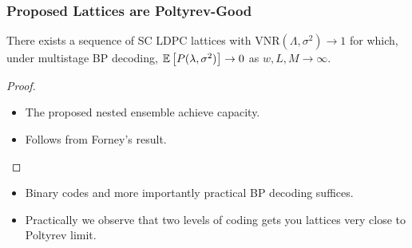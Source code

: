 \documentclass[10pt]{beamer}
\begin{document}
\begin{frame}\frametitle{Proposed Lattices are Poltyrev-Good}
\begin{theorem}
There exists a sequence of SC LDPC lattices with VNR$(\Lambda,\sigma^{2})\rightarrow 1$ for which, under multistage BP decoding, $\mathbb{E}\left[P(\lambda,\sigma^{2})\right]\rightarrow 0$ as $w,L,M  \rightarrow \infty$.
\end{theorem}    
\begin{proof}
\begin{itemize}
\item The proposed nested ensemble achieve capacity.
\item Follows from Forney's result.
\end{itemize}

\end{proof}
\vspace{0.3in}
\pause
\begin{itemize}
        \item Binary codes and more importantly practical BP decoding suffices. 
        \item Practically we observe that two levels of coding gets you lattices very close to Poltyrev limit.
    \end{itemize}
\end{frame}
	
\end{document}
